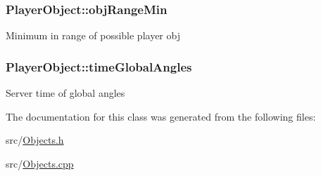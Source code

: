 \subsubsection[{\texorpdfstring{obj\+Range\+Min}{objRangeMin}}]{ Player\+Object\+::obj\+Range\+Min\hspace{0.3cm}{\ttfamily [protected]}}\hypertarget{classPlayerObject_a28e0c9103105adfd75b31192bd3f7027}{}\label{classPlayerObject_a28e0c9103105adfd75b31192bd3f7027}
Minimum in range of possible player obj 
\subsubsection[{\texorpdfstring{time\+Global\+Angles}{timeGlobalAngles}}]{ Player\+Object\+::time\+Global\+Angles\hspace{0.3cm}{\ttfamily [protected]}}\hypertarget{classPlayerObject_aa734df386c6a0c55b28cd6530cbdb116}{}\label{classPlayerObject_aa734df386c6a0c55b28cd6530cbdb116}
Server time of global angles 

The documentation for this class was generated from the following files\+:\begin{DoxyCompactItemize}
\item 
src/\hyperlink{Objects_8h}{Objects.\+h}\item 
src/\hyperlink{Objects_8cpp}{Objects.\+cpp}\end{DoxyCompactItemize}
